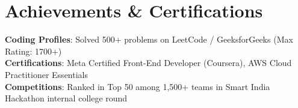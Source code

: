 \documentclass[letterpaper,10.8pt]{article}
\begin{document}
\section{Achievements \& Certifications}
 \begin{itemize}[leftmargin=0.15in, label={}]
    \small{\item{
     \textbf{Coding Profiles}{: Solved 500+ problems on LeetCode / GeeksforGeeks (Max Rating: 1700+)} \\
     \textbf{Certifications}{: Meta Certified Front-End Developer (Coursera), AWS Cloud Practitioner Essentials} \\
     \textbf{Competitions}{: Ranked in Top 50 among 1,500+ teams in Smart India Hackathon internal college round}
    }}
 \end{itemize}

\end{document}
